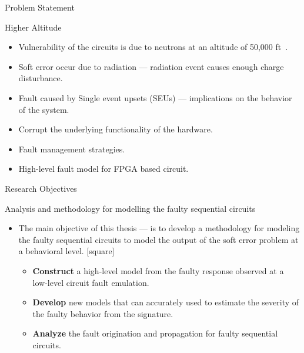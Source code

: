 \documentclass[aspectratio=1610]{beamer}
\newcommand{\semitransp}[2][35]{\color{fg!#1}#2}
\begin{document}
\begin{frame}{Problem Statement}
\vspace{-1.5cm}
\begin{block}{Higher Altitude}

\end{block}
\begin{itemize}
\item Vulnerability of the circuits is due to neutrons at an altitude of  50,000 ft~\citep{xilinnseu}.
\item Soft error occur due to radiation ---  radiation event causes enough charge disturbance.
\item Fault caused by Single event upsets (SEUs) --- implications on the behavior of the system.
\item Corrupt the underlying functionality of the hardware.


\item Fault management strategies.
\item High-level fault model for FPGA based circuit.




\end{itemize}




\end{frame}
\begin{frame}{Research Objectives}

\begin{block}{Analysis and methodology for modelling the faulty sequential circuits}
\end{block}
\begin{itemize}

\item The main objective of this thesis --- is to develop a methodology for modeling the faulty sequential circuits to model the output of the soft error problem at a behavioral level. 
\vspace{0.25cm}
[square]
\begin{itemize}
\item \textbf{Construct} a high-level model from the faulty response observed at a low-level circuit fault emulation.
\vspace{0.25cm}
\item \textbf{Develop} new models that can accurately used to estimate the severity of the faulty behavior from the signature. 



 \vspace{0.25cm}
 \item \textbf{Analyze} the fault origination and propagation for faulty sequential circuits.

\end{itemize}

\end{itemize}




\end{frame}
\end{document}
